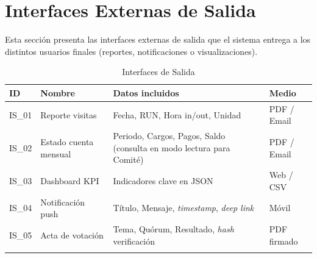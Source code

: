 \section{Interfaces Externas de Salida}
Esta sección presenta las interfaces externas de salida que el sistema entrega a los distintos usuarios finales (reportes, notificaciones o visualizaciones).

{\small
\begin{longtable}{|p{}|p{}|p{}|p{}|}
\hline
\textbf{ID} & \textbf{Nombre} & \textbf{Datos incluidos} & \textbf{Medio} \\ \hline
IS\_01 & Reporte visitas & Fecha, RUN, Hora in/out, Unidad & PDF / Email \\ \hline
IS\_02 & Estado cuenta mensual & Periodo, Cargos, Pagos, Saldo (consulta en modo lectura para Comité) & PDF / Email \\ \hline
IS\_03 & Dashboard KPI & Indicadores clave en JSON & Web / CSV \\ \hline
IS\_04 & Notificación push & Título, Mensaje, \textit{timestamp}, \textit{deep link} & Móvil \\ \hline
IS\_05 & Acta de votación & Tema, Quórum, Resultado, \textit{hash} verificación & PDF firmado \\ \hline
\caption{Interfaces de Salida}
\label{tab:salida}
\end{longtable}
}
